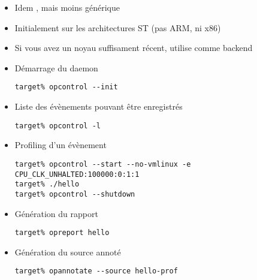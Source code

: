 \begin{frame}[fragile=singleslide]{}
  \begin{itemize}
  \item Idem , mais moins générique
  \item Initialement sur les architectures ST (pas ARM, ni x86)
  \item  Si  vous avez  un  noyau  suffisament récent,  
    utilise  comme backend
  \item Démarrage du daemon
    \begin{lstlisting}
target% opcontrol --init
    \end{lstlisting}
  \item Liste des évènements pouvant être enregistrés
    \begin{lstlisting}
target% opcontrol -l
    \end{lstlisting}
  \item Profiling d'un évènement
    \begin{lstlisting}
target% opcontrol --start --no-vmlinux -e CPU_CLK_UNHALTED:100000:0:1:1
target% ./hello
target% opcontrol --shutdown
    \end{lstlisting}
  \end{itemize}
\end{frame}

\begin{frame}[fragile=singleslide]{}
  \begin{itemize}
  \item Génération du rapport
    \begin{lstlisting}
target% opreport hello
    \end{lstlisting}
  \item Génération du source annoté
    \begin{lstlisting}
target% opannotate --source hello-prof
    \end{lstlisting}
  \end{itemize}
\end{frame}


